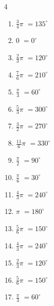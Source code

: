 \begin{multicols}{4}
\begin{enumerate}
  \item $\displaystyle \frac{3}{4}\pi$
        $\displaystyle =135^{\circ}$

  \item $\displaystyle 0$
        $\displaystyle =0^{\circ}$

  \item $\displaystyle \frac{2}{3}\pi$
        $\displaystyle =120^{\circ}$

  \item $\displaystyle \frac{7}{6}\pi$
        $\displaystyle =210^{\circ}$

  \item $\displaystyle \frac{\pi}{3}$
        $\displaystyle =60^{\circ}$

  \item $\displaystyle \frac{5}{3}\pi$
        $\displaystyle =300^{\circ}$

  \item $\displaystyle \frac{3}{2}\pi$
        $\displaystyle =270^{\circ}$

  \item $\displaystyle \frac{11}{6}\pi$
        $\displaystyle =330^{\circ}$

  \item $\displaystyle \frac{\pi}{2}$
        $\displaystyle =90^{\circ}$

  \item $\displaystyle \frac{\pi}{6}$
        $\displaystyle =30^{\circ}$

  \item $\displaystyle \frac{4}{3}\pi$
        $\displaystyle =240^{\circ}$

  \item $\displaystyle \pi$
        $\displaystyle =180^{\circ}$

  \item $\displaystyle \frac{5}{6}\pi$
        $\displaystyle =150^{\circ}$

  \item $\displaystyle \frac{4}{3}\pi$
        $\displaystyle =240^{\circ}$

  \item $\displaystyle \frac{2}{3}\pi$
        $\displaystyle =120^{\circ}$

  \item $\displaystyle \frac{5}{6}\pi$
        $\displaystyle =150^{\circ}$

  \item $\displaystyle \frac{\pi}{3}$
        $\displaystyle =60^{\circ}$


\end{enumerate}
\end{multicols}
